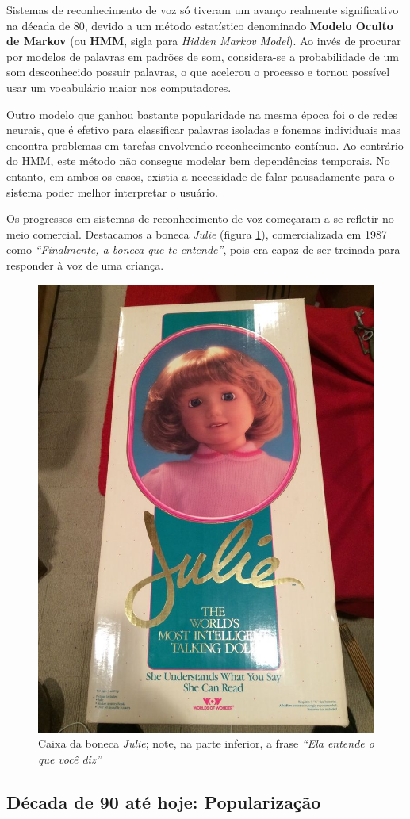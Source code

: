Sistemas de reconhecimento de voz só tiveram um avanço realmente significativo na década de 80, devido a um método estatístico denominado \textbf{Modelo Oculto de Markov} (ou \textbf{HMM}, sigla para \textit{Hidden Markov Model}). Ao invés de procurar por modelos de palavras em padrões de som, considera-se a probabilidade de um som desconhecido possuir palavras, o que acelerou o processo e tornou possível usar um vocabulário maior nos computadores.

Outro modelo que ganhou bastante popularidade na mesma época foi o de redes neurais, que é efetivo para classificar palavras isoladas e fonemas individuais mas encontra problemas em tarefas envolvendo reconhecimento contínuo. Ao contrário do HMM, este método não consegue modelar bem dependências temporais. No entanto, em ambos os casos, existia a necessidade de falar pausadamente para o sistema poder melhor interpretar o usuário.

Os progressos em sistemas de reconhecimento de voz começaram a se refletir no meio comercial. Destacamos a boneca \textit{Julie} (figura \ref{julie}), comercializada em 1987 como \textit{``Finalmente, a boneca que te entende''}, pois era capaz de ser treinada para responder à voz de uma criança.

\begin{figure}[H]
  \centering
  \includegraphics[width=.35\textwidth]{image/julie.jpg}
  \caption{Caixa da boneca \textit{Julie}; note, na parte inferior, a frase \textit{``Ela entende o que você diz''} \citep{julieImage}}
  \label{julie}
\end{figure}


\subsection{Década de 90 até hoje: Popularização}

